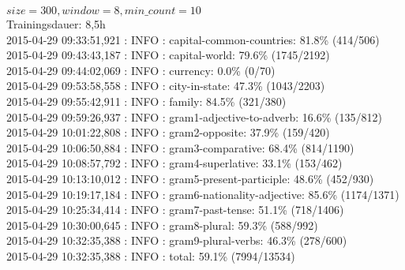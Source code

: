 \documentclass[11pt,a4paper]{article}
\begin{document}
$size=300, window=8, min\_count=10$
\\Trainingsdauer: 8,5h
\\2015-04-29 09:33:51,921 : INFO : capital-common-countries: 81.8\% (414/506)
\\2015-04-29 09:43:43,187 : INFO : capital-world: 79.6\% (1745/2192)
\\2015-04-29 09:44:02,069 : INFO : currency: 0.0\% (0/70)
\\2015-04-29 09:53:58,558 : INFO : city-in-state: 47.3\% (1043/2203)
\\2015-04-29 09:55:42,911 : INFO : family: 84.5\% (321/380)
\\2015-04-29 09:59:26,937 : INFO : gram1-adjective-to-adverb: 16.6\% (135/812)
\\2015-04-29 10:01:22,808 : INFO : gram2-opposite: 37.9\% (159/420)
\\2015-04-29 10:06:50,884 : INFO : gram3-comparative: 68.4\% (814/1190)
\\2015-04-29 10:08:57,792 : INFO : gram4-superlative: 33.1\% (153/462)
\\2015-04-29 10:13:10,012 : INFO : gram5-present-participle: 48.6\% (452/930)
\\2015-04-29 10:19:17,184 : INFO : gram6-nationality-adjective: 85.6\% (1174/1371)
\\2015-04-29 10:25:34,414 : INFO : gram7-past-tense: 51.1\% (718/1406)
\\2015-04-29 10:30:00,645 : INFO : gram8-plural: 59.3\% (588/992)
\\2015-04-29 10:32:35,388 : INFO : gram9-plural-verbs: 46.3\% (278/600)
\\2015-04-29 10:32:35,388 : INFO : total: 59.1\% (7994/13534)
\end{document}

